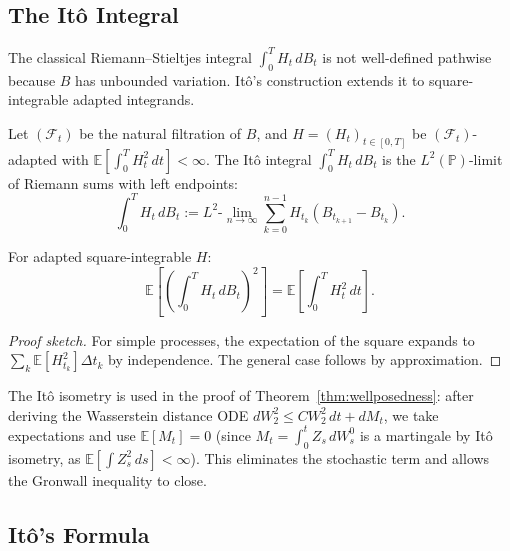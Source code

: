 \subsection{The It\^o Integral}

The classical Riemann--Stieltjes integral $\int_0^T H_t\, dB_t$ is not well-defined
pathwise because $B$ has unbounded variation. It\^o's construction extends it to
square-integrable adapted integrands.

\begin{definition}[It\^o Integral]
Let $(\mathcal{F}_t)$ be the natural filtration of $B$, and $H = (H_t)_{t \in [0,T]}$
be $(\mathcal{F}_t)$-adapted with $\mathbb{E}[\int_0^T H_t^2\, dt] < \infty$. The It\^o
integral $\int_0^T H_t\, dB_t$ is the $L^2(\mathbb{P})$-limit of Riemann sums with left
endpoints:
\[
    \int_0^T H_t\, dB_t := L^2\text{-}\lim_{n \to \infty} \sum_{k=0}^{n-1} H_{t_k}
    (B_{t_{k+1}} - B_{t_k}).
\]
\end{definition}

\begin{theorem}[It\^o Isometry]
\label{thm:ito-isometry}
For adapted square-integrable $H$:
\begin{equation}
    \mathbb{E}\left[ \left( \int_0^T H_t\, dB_t \right)^2 \right] = \mathbb{E}\left[
    \int_0^T H_t^2\, dt \right].
    \label{eq:ito-isometry}
\end{equation}
\end{theorem}

\begin{proof}[Proof sketch]
For simple processes, the expectation of the square expands to
$\sum_k \mathbb{E}[H_{t_k}^2] \Delta t_k$ by independence. The general case follows by
approximation.
\end{proof}

\begin{remark}
The It\^o isometry is used in the proof of Theorem~\ref{thm:wellposedness}: after deriving the Wasserstein
distance ODE $d W_2^2 \leq C W_2^2\, dt + dM_t$, we take expectations and use
$\mathbb{E}[M_t] = 0$ (since $M_t = \int_0^t Z_s\, dW_s^0$ is a martingale by It\^o
isometry, as $\mathbb{E}[\int Z_s^2\, ds] < \infty$). This eliminates the stochastic
term and allows the Gronwall inequality to close.
\end{remark}

\subsection{It\^o's Formula}

